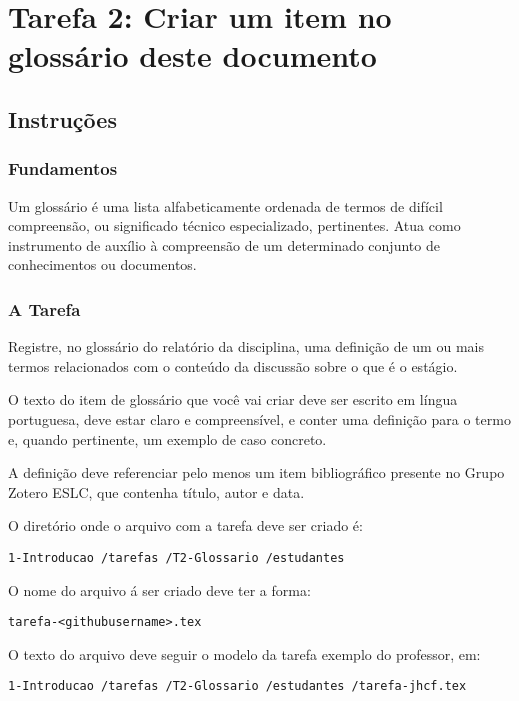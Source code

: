 \chapter{Tarefa 2: Criar um item no glossário deste documento \label{tarefa:glossario}}

\section{Instruções}

\subsection{Fundamentos}

Um glossário é uma lista alfabeticamente ordenada de termos de difícil compreensão, ou significado técnico especializado, pertinentes. Atua como instrumento de auxílio à compreensão de 
um determinado conjunto de conhecimentos ou documentos.
 
\subsection{A Tarefa}

Registre, no glossário do relatório da disciplina, uma definição de um ou mais termos relacionados com o conteúdo da discussão sobre o que é o estágio.

O texto do item de glossário que você vai criar deve ser escrito em língua portuguesa, deve estar claro e compreensível, e conter uma definição para o termo e, quando pertinente, um exemplo de caso concreto.

A definição deve referenciar pelo menos um item bibliográfico presente no Grupo Zotero ESLC, que contenha título, autor e data.


O diretório onde o arquivo com a tarefa deve ser criado é: 
\begin{verbatim}
1-Introducao /tarefas /T2-Glossario /estudantes    
\end{verbatim}

O nome do arquivo á ser criado deve ter a forma:
\begin{verbatim}
tarefa-<githubusername>.tex
\end{verbatim}

O texto do arquivo deve seguir o modelo da tarefa exemplo do professor, em:
\begin{verbatim}
1-Introducao /tarefas /T2-Glossario /estudantes /tarefa-jhcf.tex
\end{verbatim}

